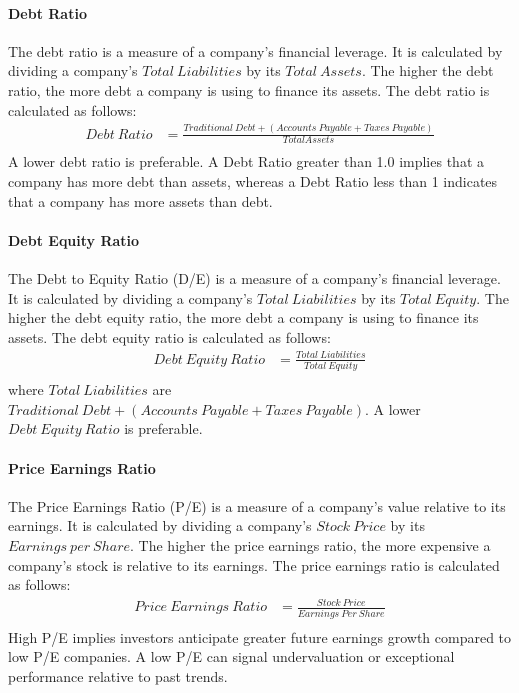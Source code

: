 \documentclass[../xlapes02]{subfiles}
\begin{document}
    \paragraph{Debt Ratio}\label{par:debt-ratio}
    The debt ratio is a measure of a company's financial leverage. It is calculated by dividing a company's $Total\ Liabilities$ by its $Total\ Assets$. The higher the debt ratio, the more debt a company is using to finance its assets. The debt ratio is calculated as follows:
    \begin{equation}
        \begin{split}
            Debt\ Ratio&=\frac{Traditional\ Debt+(Accounts\ Payable+Taxes\ Payable)}{Total Assets}\\
        \end{split}\label{eq:equation7}
    \end{equation}
    A lower debt ratio is preferable. A Debt Ratio greater than 1.0 implies that a company has more debt than assets, whereas a Debt Ratio less than 1 indicates that a company has more assets than debt.

    \paragraph{Debt Equity Ratio}\label{par:debt-equity-ratio}
    The Debt to Equity Ratio (D/E) is a measure of a company's financial leverage. It is calculated by dividing a company's $Total\ Liabilities$ by its $Total\ Equity$. The higher the debt equity ratio, the more debt a company is using to finance its assets. The debt equity ratio is calculated as follows:
    \begin{equation}
        \begin{split}
            Debt\ Equity\ Ratio&=\frac{Total\ Liabilities}{Total\ Equity}\\
        \end{split}\label{eq:equation6}
    \end{equation}
    where $Total\ Liabilities$ are $Traditional\ Debt+(Accounts\ Payable+Taxes\ Payable)$. A lower $Debt\ Equity\ Ratio$ is preferable.

    \paragraph{Price Earnings Ratio}\label{par:price-earnings-ratio}
    The Price Earnings Ratio (P/E) is a measure of a company's value relative to its earnings. It is calculated by dividing a company's $Stock\ Price$ by its $Earnings\ per\ Share$. The higher the price earnings ratio, the more expensive a company's stock is relative to its earnings. The price earnings ratio is calculated as follows:
    \begin{equation}
        \begin{split}
            Price\ Earnings\ Ratio&=\frac{Stock\ Price}{Earnings\ Per\ Share}\\
        \end{split}\label{eq:equation6}
    \end{equation}
    High P/E implies investors anticipate greater future earnings growth compared to low P/E companies. A low P/E can signal undervaluation or exceptional performance relative to past trends.
\end{document}

